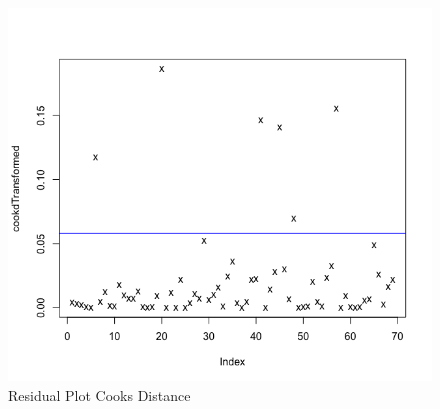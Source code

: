 \documentclass[12pt]{article}
\makeatletter
\theoremstyle{homework}
\newenvironment{exercise}[1]
{\def\@currentlabel{#1}\exercisecore}
{\endexercisecore}
\makeatother
\begin{document}
\begin{exercise}{1}
\begin{enumerate}
\begin{figure}[H]
\begin{center}
        \end{center}
      \end{figure}
      \begin{figure}[H]
        \begin{center}
        \caption{Residual Plot Cooks Distance}
        \includegraphics[width = \textwidth]{Rplot05.png}
        \end{center}
      \end{figure}




      \newpage


\end{enumerate}
\end{exercise}
\end{document}
